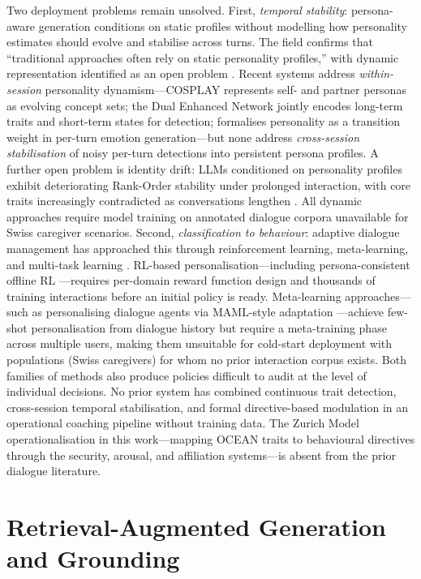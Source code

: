 \documentclass[10pt,a4paper]{report}
\begin{document}
Two deployment problems remain unsolved. First, \emph{temporal stability}: persona-aware generation conditions on static profiles \citep{Li2016, Majumder2020} without modelling how personality estimates should evolve and stabilise across turns. The field confirms that ``traditional approaches often rely on static personality profiles,'' with dynamic representation identified as an open problem \citep{Zheng2019}. Recent systems address \emph{within-session} personality dynamism---COSPLAY \citep{Xu2022} represents self- and partner personas as evolving concept sets; the Dual Enhanced Network \citep{Zhu2024} jointly encodes long-term traits and short-term states for detection; \citet{Wen2024b} formalises personality as a transition weight in per-turn emotion generation---but none address \emph{cross-session stabilisation} of noisy per-turn detections into persistent persona profiles. A further open problem is identity drift: LLMs conditioned on personality profiles exhibit deteriorating Rank-Order stability under prolonged interaction, with core traits increasingly contradicted as conversations lengthen \citep{Kovac2024}. All dynamic approaches require model training on annotated dialogue corpora unavailable for Swiss caregiver scenarios. Second, \emph{classification to behaviour}: adaptive dialogue management has approached this through reinforcement learning, meta-learning, and multi-task learning \citep{denHengst2019, Lee2021}. RL-based personalisation---including persona-consistent offline RL \citep{Shea2023}---requires per-domain reward function design and thousands of training interactions before an initial policy is ready. Meta-learning approaches---such as personalising dialogue agents via MAML-style adaptation \citep{Lin2019}---achieve few-shot personalisation from dialogue history but require a meta-training phase across multiple users, making them unsuitable for cold-start deployment with populations (Swiss caregivers) for whom no prior interaction corpus exists. Both families of methods also produce policies difficult to audit at the level of individual decisions. No prior system has combined continuous trait detection, cross-session temporal stabilisation, and formal directive-based modulation in an operational coaching pipeline without training data. The Zurich Model operationalisation in this work---mapping OCEAN traits to behavioural directives through the security, arousal, and affiliation systems---is absent from the prior dialogue literature.

\section{Retrieval-Augmented Generation and Grounding}
\end{document}
